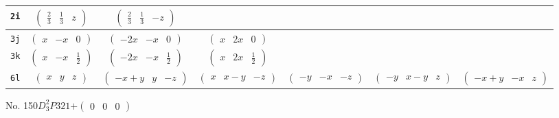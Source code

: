 \documentclass[fleqn,9pt,landscape]{jsarticle}
\begin{document}
\begin{center}
\begin{longtable}{ccccccc}
{\tt 2i} & $ \begin{pmatrix} \frac{2}{3} & \frac{1}{3} & z \end{pmatrix} $ & $ \begin{pmatrix} \frac{2}{3} & \frac{1}{3} & - z \end{pmatrix} $ & $  $ & $  $ & $  $ & $  $ \\ \hline
{\tt 3j} & $ \begin{pmatrix} x & - x & 0 \end{pmatrix} $ & $ \begin{pmatrix} - 2 x & - x & 0 \end{pmatrix} $ & $ \begin{pmatrix} x & 2 x & 0 \end{pmatrix} $ & $  $ & $  $ & $  $ \\ \hline
{\tt 3k} & $ \begin{pmatrix} x & - x & \frac{1}{2} \end{pmatrix} $ & $ \begin{pmatrix} - 2 x & - x & \frac{1}{2} \end{pmatrix} $ & $ \begin{pmatrix} x & 2 x & \frac{1}{2} \end{pmatrix} $ & $  $ & $  $ & $  $ \\ \hline
{\tt 6l} & $ \begin{pmatrix} x & y & z \end{pmatrix} $ & $ \begin{pmatrix} - x + y & y & - z \end{pmatrix} $ & $ \begin{pmatrix} x & x - y & - z \end{pmatrix} $ & $ \begin{pmatrix} - y & - x & - z \end{pmatrix} $ & $ \begin{pmatrix} - y & x - y & z \end{pmatrix} $ & $ \begin{pmatrix} - x + y & - x & z \end{pmatrix} $ \\
\end{longtable}
\end{center}
\newpage
No. 150\quad$D_{3}^{2}$\quad$P321$\quad[ trigonal ]\quad$+\begin{pmatrix} 0 & 0 & 0 \end{pmatrix}$
\end{document}

